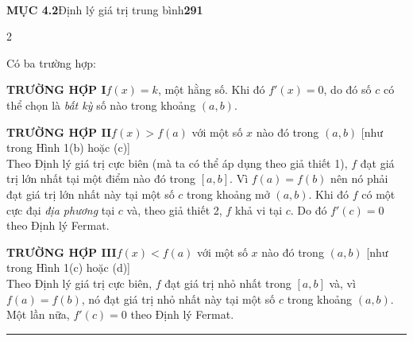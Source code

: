 \noindent
\begin{minipage}[b]{145pt}
~
\end{minipage}\hspace{20.6pt}%
\begin{minipage}[b]{360pt}
\textsf{\textbf{MỤC 4.2}}\quad \textsf{Định lý giá trị trung bình}\hfill \textsf{\textbf{291}}
\vspace{2pt}
\end{minipage}

\vspace{10pt}

\setcolumnwidth{145pt, 360pt}
\setlength{\columnsep}{20.6pt}

\begin{paracol}{2}

\switchcolumn[0]
\noindent
{}

\switchcolumn[1]
\quad Có ba trường hợp:

\smallskip
\noindent\textsf{\textbf{TRƯỜNG HỢP I}}\quad $f(x) = k$, một hằng số. Khi đó $f'(x) = 0$, do đó số $c$ có thể chọn là \textit{bất kỳ} số nào trong khoảng $(a, b)$.

\smallskip
\noindent\textsf{\textbf{TRƯỜNG HỢP II}}\quad $f(x) > f(a)$ với một số $x$ nào đó trong $(a, b)$ \quad \textsf{\small[như trong Hình 1(b) hoặc (c)]}\\
Theo Định lý giá trị cực biên (mà ta có thể áp dụng theo giả thiết 1), $f$ đạt giá trị lớn nhất tại một điểm nào đó trong $[a, b]$. Vì $f(a) = f(b)$ nên nó phải đạt giá trị lớn nhất này tại một số $c$ trong khoảng mở $(a, b)$. Khi đó $f$ có một cực đại \textit{địa phương} tại $c$ và, theo giả thiết 2, $f$ khả vi tại $c$. Do đó $f'(c) = 0$ theo Định lý Fermat.

\smallskip
\noindent\textsf{\textbf{TRƯỜNG HỢP III}}\quad $f(x) < f(a)$ với một số $x$ nào đó trong $(a, b)$ \quad \textsf{\small[như trong Hình 1(c) hoặc (d)]}\\
Theo Định lý giá trị cực biên, $f$ đạt giá trị nhỏ nhất trong $[a, b]$ và, vì $f(a) = f(b)$, nó đạt giá trị nhỏ nhất này tại một số $c$ trong khoảng $(a, b)$. Một lần nữa, $f'(c) = 0$ theo Định lý Fermat.\hfill\textcolor{boxred}{\rule{1.1ex}{1.1ex}}


\end{paracol}
